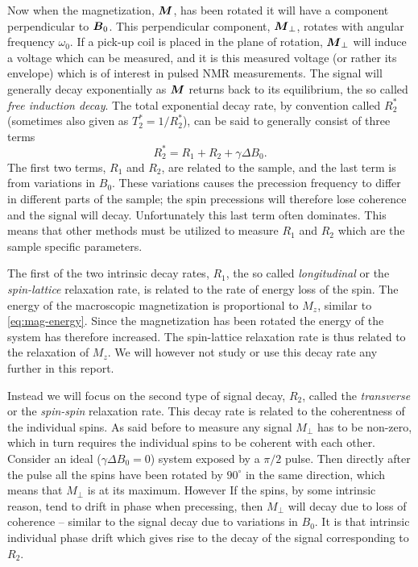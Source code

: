 \documentclass[11pt,a4paper, twocolumn,
swedish, english %
]{article}
\begin{document}

Now when the magnetization, $\vb*M$, has been rotated it will have a
component perpendicular to $\vb*B_0$. This perpendicular component,
$\vb*M_\perp$, rotates with angular frequency $\omega_0$. If a pick-up
coil is placed in the plane of rotation, $\vb*M_\perp$ will induce a
voltage which can be measured, and it is this measured voltage (or
rather its envelope) which is of interest in pulsed NMR
measurements. The signal will generally decay exponentially as
$\vb*M$ returns back to its equilibrium, the so called 
\emph{free induction decay}. The total exponential decay rate, by
convention called $R_2^*$ (sometimes also given as $T_2^*=1/R_2^*$),
can be said to generally consist of three terms 
\begin{equation}
R_2^*= R_1 + R_2 + \gamma\Delta B_0.
\end{equation}
The first two terms, $R_1$ and $R_2$, are related to the sample, and
the last term is from variations in $B_0$. These variations causes the
precession frequency to differ in different parts of the sample; the
spin precessions will therefore lose coherence and the signal will
decay. Unfortunately this last term often dominates. This means that
other methods must be utilized to measure $R_1$ and $R_2$ which are the
sample specific parameters. 

The first of the two intrinsic decay rates, $R_1$, the so called
\emph{longitudinal} or the \emph{spin-lattice} relaxation rate, is
related to the rate of energy loss of the spin. The energy of the
macroscopic magnetization is proportional to $M_z$, similar to
\eqref{eq:mag-energy}. Since the magnetization has been rotated the
energy of the system has therefore increased. The spin-lattice
relaxation rate is thus related to the relaxation of $M_z$. We
will however not study or use this decay rate any further in this
report. 

Instead we will focus on the second type of signal decay, $R_2$,
called the \emph{transverse} or the \emph{spin-spin} relaxation
rate. This decay rate is related to the coherentness of the individual
spins. As said before to measure any signal $M_\perp$ has to be
non-zero, which in turn requires the individual spins to be coherent
with each other. Consider an ideal ($\gamma\Delta B_0=0$) system
exposed by a $\pi/2$ pulse. Then directly after the pulse all the
spins have been rotated by $90^\circ$ in the same direction, which
means that $M_\perp$ is at its maximum. However If the spins, by some
intrinsic reason, tend to drift in phase when precessing, then
$M_\perp$ will decay due to loss of coherence -- similar to the signal
decay due to variations in $B_0$. It is that intrinsic individual
phase drift which gives rise to the decay of the signal corresponding
to $R_2$.  
\end{document}
